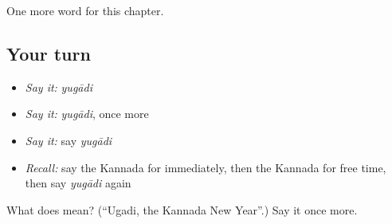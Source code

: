 \begin{grammarlens}[title={What you've built}]
One more word for this chapter.
\end{grammarlens}

\subsection*{Your turn}
\begin{itemize}
\raggedright
  \item \emph{Say it:} \emph{yugādi}
  \item \emph{Say it:} \emph{yugādi}, once more
  \item \emph{Say it:} say \emph{yugādi}
  \item \emph{Recall:} say the Kannada for immediately, then the Kannada for free time, then say \emph{yugādi} again
\end{itemize}

\begin{tcolorbox}[breakable,colback=teal!4,colframe=teal!35!black,title={Before you move on}]
What does  mean? (\textquotedblleft{}Ugadi, the Kannada New Year\textquotedblright{}.) Say it once more.
\end{tcolorbox}
